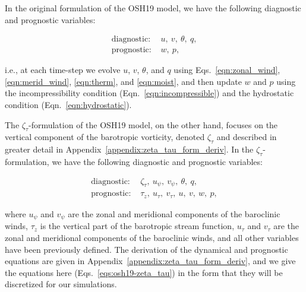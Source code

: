 In the original formulation of the OSH19 model, we have the following diagnostic and prognostic variables:

\begin{equation}
	\begin{aligned}
		\text{diagnostic: }& u,\ v,\ \theta,\ q,\\
		\text{prognostic: }& w,\ p,
	\end{aligned}
\end{equation}

i.e., at each time-step we evolve $u$, $v$, $\theta$, and $q$ using Eqs.~\ref{eqn:zonal_wind}, \ref{eqn:merid_wind}, \ref{eqn:therm}, and \ref{eqn:moist}, and then update $w$ and $p$ using the incompressibility condition (Eqn.~\ref{eqn:incompressible}) and the hydrostatic condition (Eqn.~\ref{eqn:hydrostatic}).

The $\zeta_{\tau}$-formulation of the OSH19 model, on the other hand, focuses on the vertical component of the barotropic vorticity, denoted $\zeta_{\tau}$ and described in greater detail in Appendix~\ref{appendix:zeta_tau_form_deriv}. In the $\zeta_{\tau}$-formulation, we have the following diagnostic and prognostic variables:

\begin{equation}
	\begin{aligned}
		\text{diagnostic: }& \zeta_{\tau},\ u_{\psi},\ v_{\psi},\ \theta,\ q,\\
		\text{prognostic: }&  \tau_z,\ u_{\tau},\ v_{\tau},\ u,\ v,\ w,\ p,
	\end{aligned}
\end{equation}

where $u_{\psi}$ and $v_{\psi}$ are the zonal and meridional components of the baroclinic winds, $\tau_z$ is the vertical part of the barotropic stream function, $u_{\tau}$ and $v_{\tau}$ are the zonal and meridional components of the baroclinic winds, and all other variables have been previously defined. The derivation of the dynamical and prognostic equations are given in Appendix~\ref{appendix:zeta_tau_form_deriv}, and we give the equations here (Eqs.~\ref{eqs:osh19-zeta_tau}) in the form that they will be discretized for our simulations.

